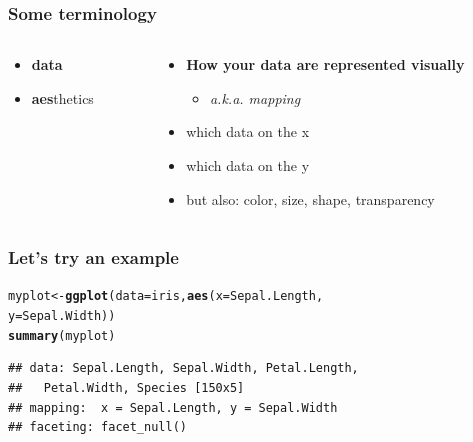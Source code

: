 \documentclass{beamer}\usepackage[]{graphicx}\usepackage[]{color}
\makeatletter
\newcommand{\hlstd}[1]{\textcolor[rgb]{0.345,0.345,0.345}{#1}}%
\newcommand{\hlkwb}[1]{\textcolor[rgb]{0.69,0.353,0.396}{#1}}%
\newcommand{\hlkwc}[1]{\textcolor[rgb]{0.333,0.667,0.333}{#1}}%
\newcommand{\hlkwd}[1]{\textcolor[rgb]{0.737,0.353,0.396}{\textbf{#1}}}%
\newenvironment{kframe}{%
 \def\at@end@of@kframe{}%
 \ifinner\ifhmode%
  \def\at@end@of@kframe{\end{minipage}}%
  \begin{minipage}{\columnwidth}%
 \fi\fi%
 \def\FrameCommand##1{\hskip\@totalleftmargin \hskip-\fboxsep
 \colorbox{shadecolor}{##1}\hskip-\fboxsep
     \hskip-\linewidth \hskip-\@totalleftmargin \hskip\columnwidth}%
 \MakeFramed {\advance\hsize-\width
   \@totalleftmargin\z@ \linewidth\hsize
   \@setminipage}}%
 {\par\unskip\endMakeFramed%
 \at@end@of@kframe}
\newenvironment{knitrout}{}{} %
\makeatother
\begin{document}
\begin{frame}[fragile]
\frametitle{Some terminology}
\begin{columns}[t]

\begin{column}[T]{3cm}
\begin{itemize}
    \item \textbf{\color{gray}data}
    \item \textbf{aes}thetics
\end{itemize}
\end{column}

\begin{column}[T]{8cm}
\begin{itemize}
    \item \textbf{How your data are represented visually}
        \begin{itemize}
        \item \emph{a.k.a. mapping}
        \end{itemize}
    \item which data on the x
    \item which data on the y
    \item but also: {\color{red}color}, {\LARGE{size}}, shape, transparency
\end{itemize}
\end{column}

\end{columns}
\end{frame}


\begin{frame}[fragile]
\frametitle{Let's try an example}
\begin{knitrout}\footnotesize
{}\color{fgcolor}\begin{kframe}
\begin{alltt}
\hlstd{myplot} \hlkwb{<-} \hlkwd{ggplot}\hlstd{(}\hlkwc{data} \hlstd{= iris,} \hlkwd{aes}\hlstd{(}\hlkwc{x} \hlstd{= Sepal.Length,}
                        \hlkwc{y} \hlstd{= Sepal.Width))}
\hlkwd{summary}\hlstd{(myplot)}
\end{alltt}
\begin{verbatim}
## data: Sepal.Length, Sepal.Width, Petal.Length,
##   Petal.Width, Species [150x5]
## mapping:  x = Sepal.Length, y = Sepal.Width
## faceting: facet_null()
\end{verbatim}
\end{kframe}
\end{knitrout}
\end{frame}
\end{document}
